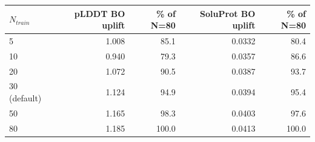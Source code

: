 \begin{tabular}{lrrrr}
\toprule
$N_{train}$ & pLDDT BO uplift & \% of N=80 & SoluProt BO uplift & \% of N=80 \\
\midrule
5 & 1.008 & 85.1 & 0.0332 & 80.4 \\
10 & 0.940 & 79.3 & 0.0357 & 86.6 \\
20 & 1.072 & 90.5 & 0.0387 & 93.7 \\
30 (default) & 1.124 & 94.9 & 0.0394 & 95.4 \\
50 & 1.165 & 98.3 & 0.0403 & 97.6 \\
80 & 1.185 & 100.0 & 0.0413 & 100.0 \\
\bottomrule
\end{tabular}